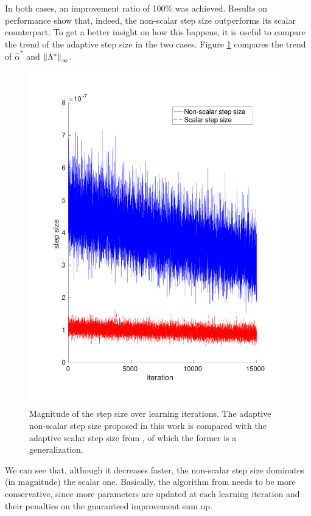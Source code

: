 In both cases, an improvement ratio of 100\% was achieved.
Results on performance show that, indeed, the non-scalar step size outperforms its scalar counterpart.
To get a better insight on how this happens, it is useful to compare the trend of the adaptive step size in the two cases. Figure \ref{fig:13} compares the trend of $\hat{\alpha}^*$ and $\left\|\Lambda^*\right\|_{\infty}$.

\begin{figure}[h!]
\includegraphics[width=\textwidth,left]{Images/stepsize.pdf}
\caption[Comparison of the trend of scalar and non-scalar step size.]{Magnitude of the step size over learning iterations. The adaptive non-scalar step size proposed in this work is compared with the adaptive scalar step size from \cite{NIPS2013_5186}, of which the former is a generalization.}
\label{fig:13}
\end{figure}

We can see that, although it decreases faster, the non-scalar step size dominates (in magnitude) the scalar one. Basically, the algorithm from \cite{NIPS2013_5186} needs to be more conservative, since more parameters are updated at each learning iteration and their penalties on the guaranteed improvement sum up.

